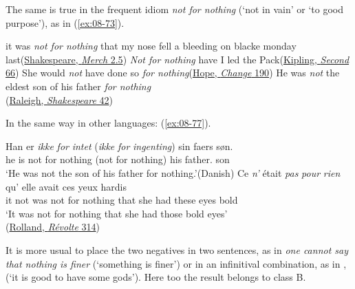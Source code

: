 The same is true in the frequent idiom \textit{not for nothing} (`not in vain' or `to good purpose'), as in (\ref{ex:08-73}).

\ea \label{ex:08-73}
\ea
it was \emph{not for nothing} that my nose fell a bleeding on blacke monday last\hfill(\href{https://internetshakespeare.uvic.ca/doc/MV_F1/scene/2.5/index.html#tln-860}{Shakespeare, \textit{Merch} 2.5}) %
\ex
\emph{Not for nothing} have I led the Pack\hfill(\href{https://archive.org/details/the-second-jungle-book-rudyard-kipling/page/n43/mode/2up?q=%22not+for+nothing%22&view=theater}{Kipling, \textit{Second} 66}) %
\ex
She would \emph{not} have done so \emph{for nothing}\hfill(\href{https://archive.org/details/achangeair00hopegoog/page/n192/mode/2up?q=%22she+would+not+have+done+so%22&view=theater}{Hope, \textit{Change} 190})
\ex
He was \emph{not} the eldest son of his father \emph{for nothing}\\\hfill(\href{https://archive.org/details/shakespeare00rale/page/42/mode/2up?q=%22not+the+eldest%22&view=theater}{Raleigh, \textit{Shakespeare} 42})
\z
\z

In the same way in other languages: (\ref{ex:08-77}).

\ea \label{ex:08-77}
\ea{}
\gll Han er \emph{ikke} \emph{for} \emph{intet} (\emph{ikke} \emph{for} \emph{ingenting}) sin faers søn.\\
 he is not for nothing (not for nothing) his father.\POSS{} son\\
\glt `He was not the son of his father for nothing.'\hfill(Danish)
\ex
\gll Ce \emph{n'} était \emph{pas} \emph{pour} \emph{rien} qu' elle avait ces yeux hardis\\
 it not was not for nothing that she had these eyes bold\\
\glt `It was not for nothing that she had those bold eyes'\\\hfill(\href{https://www.gutenberg.org/cache/epub/61876/pg61876-images.html}{Rolland, \textit{Révolte} 314})
\z
\z
{}

It is more usual to place the two negatives in two sentences, %
as in \textit{one cannot say that nothing is finer} (`something is finer') or in an infinitival combination, as in , (`it is good to have some gods'). Here too the result belongs to class B. 

